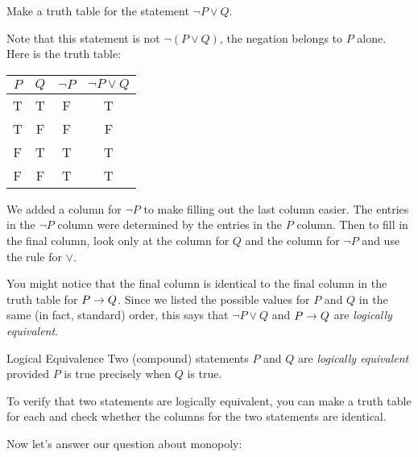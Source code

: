 \documentclass[12pt]{article}
\begin{document}
\begin{example}
 Make a truth table for the statement $\neg P \vee Q$.

\begin{solution}
Note that this statement is not $\neg(P \vee Q)$, the negation belongs to $P$ alone.  Here is the truth table:

 \begin{center}
	 \begin{tabular}{c|c||c|c}
 $P$ & $Q$ & $\neg P$ & $\neg P \vee Q$ \\ \hline
 T & T & F & T\\
 T & F & F & F\\
 F & T & T & T\\
 F & F & T & T
\end{tabular}
\end{center}

We added a column for $\neg P$ to make filling out the last column easier.  The entries in the $\neg P$ column were determined by the entries in the $P$ column.  Then to fill in the final column, look only at the column for $Q$ and the column for $\neg P$ and use the rule for $\vee$.  


\end{solution}

\end{example}

You might notice that the final column is identical to the final column in the truth table for $P \rightarrow Q$.  Since we listed the possible values for $P$ and $Q$ in the same (in fact, standard) order, this says that $\neg P \vee Q$ and $P \rightarrow Q$ are {\em logically equivalent}.

\begin{defbox}{Logical Equivalence}
Two (compound) statements $P$ and $Q$ are \emph{logically equivalent}  provided $P$ is true precisely when $Q$ is true.

To verify that two statements are logically equivalent, you can make a truth table for each and check whether the columns for the two statements are identical.
\end{defbox}



Now let's answer our question about monopoly:
\end{document}
